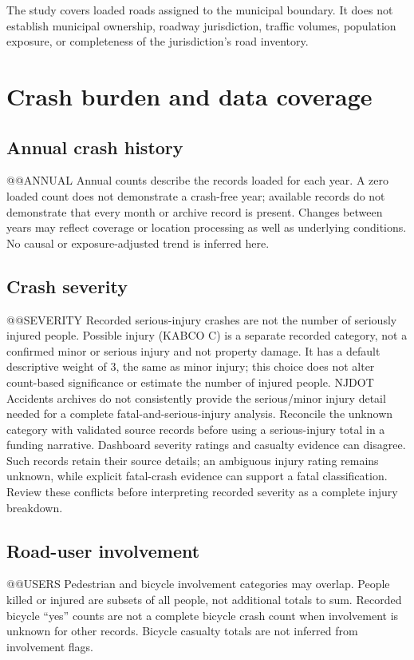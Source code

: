 \documentclass[10pt,letterpaper]{article}
\begin{document}
The study covers loaded roads assigned to the municipal boundary. It does not
establish municipal ownership, roadway jurisdiction, traffic volumes, population
exposure, or completeness of the jurisdiction's road inventory.

\clearpage
\section{Crash burden and data coverage}
\subsection{Annual crash history}
@@ANNUAL
Annual counts describe the records loaded for each year. A zero loaded count does
not demonstrate a crash-free year; available records do not demonstrate that every
month or archive record is present. Changes between years may reflect coverage or
location processing as well as underlying conditions. No causal or exposure-adjusted
trend is inferred here.

\subsection{Crash severity}
@@SEVERITY
Recorded serious-injury crashes are not the number of seriously injured people.
Possible injury (KABCO C) is a separate recorded category, not a confirmed minor
or serious injury and not property damage. It has a default descriptive weight
of 3, the same as minor injury; this choice does not alter count-based significance
or estimate the number of injured people.
NJDOT Accidents archives do not consistently provide the serious/minor injury
detail needed for a complete fatal-and-serious-injury analysis. Reconcile the
unknown category with validated source records before using a serious-injury total
in a funding narrative.
Dashboard severity ratings and casualty evidence can disagree. Such records retain
their source details; an ambiguous injury rating remains unknown, while explicit
fatal-crash evidence can support a fatal classification. Review these conflicts
before interpreting recorded severity as a complete injury breakdown.
\newpage
\subsection{Road-user involvement}
@@USERS
Pedestrian and bicycle involvement categories may overlap. People killed or injured
are subsets of all people, not additional totals to sum. Recorded bicycle ``yes''
counts are not a complete bicycle crash count when involvement is unknown for other
records. Bicycle casualty totals are not inferred from involvement flags.
\end{document}
